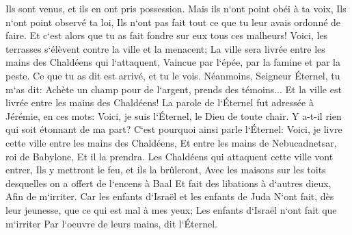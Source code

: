 \verse Ils sont venus, et ils en ont pris possession. Mais ils n`ont point obéi à ta voix, Ils n`ont point observé ta loi, Ils n`ont pas fait tout ce que tu leur avais ordonné de faire. Et c`est alors que tu as fait fondre sur eux tous ces malheurs! 
\verse Voici, les terrasses s`élèvent contre la ville et la menacent; La ville sera livrée entre les mains des Chaldéens qui l`attaquent, Vaincue par l`épée, par la famine et par la peste. Ce que tu as dit est arrivé, et tu le vois. 
\verse Néanmoins, Seigneur Éternel, tu m`as dit: Achète un champ pour de l`argent, prends des témoins... Et la ville est livrée entre les mains des Chaldéens! 
\verse La parole de l`Éternel fut adressée à Jérémie, en ces mots: 
\verse Voici, je suis l`Éternel, le Dieu de toute chair. Y a-t-il rien qui soit étonnant de ma part? 
\verse C`est pourquoi ainsi parle l`Éternel: Voici, je livre cette ville entre les mains des Chaldéens, Et entre les mains de Nebucadnetsar, roi de Babylone, Et il la prendra. 
\verse Les Chaldéens qui attaquent cette ville vont entrer, Ils y mettront le feu, et ils la brûleront, Avec les maisons sur les toits desquelles on a offert de l`encens à Baal Et fait des libations à d`autres dieux, Afin de m`irriter. 
\verse Car les enfants d`Israël et les enfants de Juda N`ont fait, dès leur jeunesse, que ce qui est mal à mes yeux; Les enfants d`Israël n`ont fait que m`irriter Par l`oeuvre de leurs mains, dit l`Éternel. 
